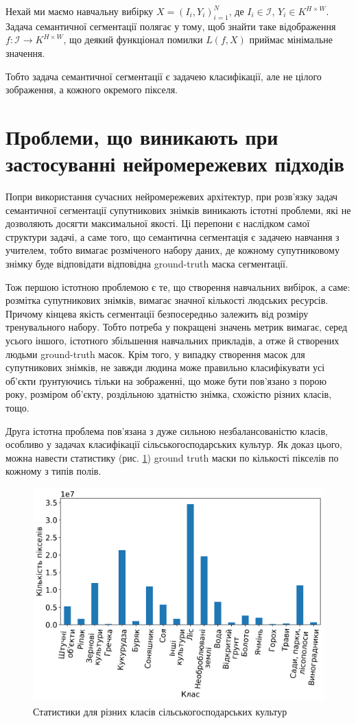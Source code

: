 \documentclass{ConfFTI}
\begin{document}
Нехай ми маємо навчальну вибірку $X=(I_i, Y_i)_{i=1}^{N}$,
де $I_i \in \mathcal{I}$, $Y_i \in K^{H \times W}$.
Задача семантичної сегментації полягає у тому, щоб
знайти таке відображення
$f: \mathcal{I} \rightarrow K^{H \times W}$, що деякий функціонал помилки
$L(f, X)$ приймає мінімальне значення.

Тобто задача семантичної сегментації є задачею класифікації, але
не цілого зображення, а кожного окремого пікселя.

\section{Проблеми, що виникають при застосуванні нейромережевих підходів}

Попри використання сучасних нейромережевих
архітектур, при розв'язку задач
семантичної сегментації супутникових знімків
виникають істотні проблеми, які не дозволяють
досягти максимальної якості. Ці перепони
є наслідком самої структури задачі, а саме того, що
семантична сегментація є задачею навчання з учителем, тобто вимагає розміченого
набору даних, де кожному супутниковому знімку буде
відповідати відповідна ground-truth маска сегментації.

Тож першою істотною проблемою є те, що створення
навчальних вибірок, а саме: розмітка супутникових знімків,
вимагає значної кількості людських ресурсів. Причому кінцева
якість сегментації безпосередньо залежить від
розміру тренувального набору. Тобто потреба у
покращені значень метрик вимагає, серед усього іншого,
істотного збільшення навчальних прикладів,
а отже й створених людьми ground-truth масок.
Крім того, у випадку створення масок для супутникових знімків,
не завжди людина може правильно класифікувати усі об'єкти ґрунтуючись
тільки на зображенні, що може бути пов'язано з порою року,
розміром об'єкту, роздільною здатністю знімка, схожістю різних класів, тощо.

Друга істотна проблема пов'язана з дуже сильною
незбалансованістю класів, особливо у задачах класифікації
сільськогосподарських культур. Як доказ цього, можна
навести статистику (рис. \ref{fig:pixels_per_class}) ground truth
маски по кількості пікселів по кожному з
типів полів.

\begin{figure}[ht!]
	\centering
	\includegraphics[width=0.49 \textwidth]{dist_real.png}
	\caption{Статистики для різних класів сільськогосподарських культур}
	\label{fig:pixels_per_class}
\end{figure}
\end{document}

